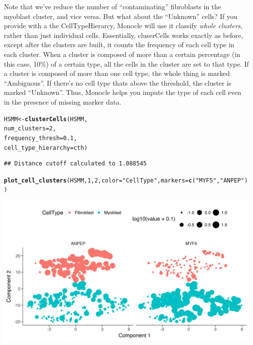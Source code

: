 \documentclass[10pt,oneside]{article}\usepackage[]{graphicx}\usepackage[]{color}
\makeatletter
\def\maxwidth{ %
  \ifdim\Gin@nat@width>\linewidth
    \linewidth
  \else
    \Gin@nat@width
  \fi
}
\newcommand{\hlnum}[1]{\textcolor[rgb]{0.686,0.059,0.569}{#1}}%
\newcommand{\hlstr}[1]{\textcolor[rgb]{0.192,0.494,0.8}{#1}}%
\newcommand{\hlstd}[1]{\textcolor[rgb]{0.345,0.345,0.345}{#1}}%
\newcommand{\hlkwb}[1]{\textcolor[rgb]{0.69,0.353,0.396}{#1}}%
\newcommand{\hlkwc}[1]{\textcolor[rgb]{0.333,0.667,0.333}{#1}}%
\newcommand{\hlkwd}[1]{\textcolor[rgb]{0.737,0.353,0.396}{\textbf{#1}}}%
\newenvironment{kframe}{%
 \def\at@end@of@kframe{}%
 \ifinner\ifhmode%
  \def\at@end@of@kframe{\end{minipage}}%
  \begin{minipage}{\columnwidth}%
 \fi\fi%
 \def\FrameCommand##1{\hskip\@totalleftmargin \hskip-\fboxsep
 \colorbox{shadecolor}{##1}\hskip-\fboxsep
     \hskip-\linewidth \hskip-\@totalleftmargin \hskip\columnwidth}%
 \MakeFramed {\advance\hsize-\width
   \@totalleftmargin\z@ \linewidth\hsize
   \@setminipage}}%
 {\par\unskip\endMakeFramed%
 \at@end@of@kframe}
\newenvironment{knitrout}{}{} %
\makeatother
\begin{document}
 Note that we've reduce the number of ``contaminating'' fibroblasts in the myoblast cluster, and vice versa. But what about the ``Unknown'' cells? If you provide  with a the CellTypeHierarcy, Monocle will use it classify \emph{whole clusters}, rather than just individual cells. Essentially, cluserCells works exactly as before, except after the clusters are built, it counts the frequency of each cell type in each cluster. When a cluster is composed of more than a certain percentage (in this case, 10\%) of a certain type, all the cells in the cluster are set to that type. If a cluster is composed of more than one cell type, the whole thing is marked ``Ambiguous''. If there's no cell type thats above the threshold, the cluster is marked ``Unknown''. Thus, Monocle helps you impute the type of each cell even in the presence of missing marker data.
 
\begin{knitrout}
\color{fgcolor}\begin{kframe}
\begin{alltt}
\hlstd{HSMM} \hlkwb{<-} \hlkwd{clusterCells}\hlstd{(HSMM,}
                     \hlkwc{num_clusters}\hlstd{=}\hlnum{2}\hlstd{,}
                     \hlkwc{frequency_thresh}\hlstd{=}\hlnum{0.1}\hlstd{,}
                     \hlkwc{cell_type_hierarchy}\hlstd{=cth)}
\end{alltt}
\begin{verbatim}
## Distance cutoff calculated to 1.088545
\end{verbatim}


{\ttfamily\noindent\itshape\color{messagecolor}{\#\# the length of the distance: 34191}}\begin{alltt}
\hlkwd{plot_cell_clusters}\hlstd{(HSMM,} \hlnum{1}\hlstd{,} \hlnum{2}\hlstd{,} \hlkwc{color}\hlstd{=}\hlstr{"CellType"}\hlstd{,} \hlkwc{markers} \hlstd{=} \hlkwd{c}\hlstd{(}\hlstr{"MYF5"}\hlstd{,} \hlstr{"ANPEP"}\hlstd{))}
\end{alltt}
\end{kframe}

{\centering \includegraphics[width=\maxwidth]{figure/cluster_cells_semisup_clustering_with_impute-1} 

}



\end{knitrout}
 
\end{document}
